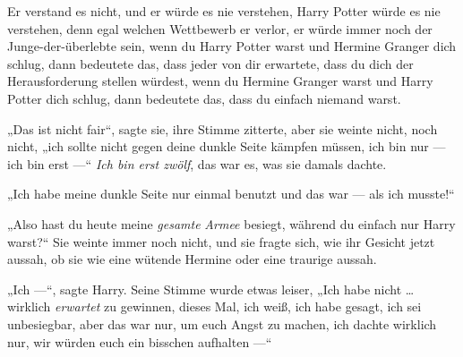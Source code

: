 Er verstand es nicht, und er würde es nie verstehen, Harry Potter würde es nie verstehen, denn egal welchen Wettbewerb er verlor, er würde immer noch der Junge-der-überlebte sein, wenn du Harry Potter warst und Hermine Granger dich schlug, dann bedeutete das, dass jeder von dir erwartete, dass du dich der Herausforderung stellen würdest, wenn du Hermine Granger warst und Harry Potter dich schlug, dann bedeutete das, dass du einfach niemand warst.

„Das ist nicht fair“, sagte sie, ihre Stimme zitterte, aber sie weinte nicht, noch nicht, „ich sollte nicht gegen deine dunkle Seite kämpfen müssen, ich bin nur — ich bin erst —“ \emph{Ich bin erst zwölf}, das war es, was sie damals dachte.%

„Ich habe meine dunkle Seite nur einmal benutzt und das war — als ich musste!“

„Also hast du heute meine \emph{gesamte} \emph{Armee} besiegt, während du einfach nur Harry warst?“ Sie weinte immer noch nicht, und sie fragte sich, wie ihr Gesicht jetzt aussah, ob sie wie eine wütende Hermine oder eine traurige aussah.

„Ich —“, sagte Harry. Seine Stimme wurde etwas leiser,
„Ich habe nicht … wirklich \emph{erwartet} zu gewinnen, dieses Mal, ich weiß, ich habe gesagt, ich sei unbesiegbar, aber das war nur, um euch Angst zu machen, ich dachte wirklich nur, wir würden euch ein bisschen aufhalten —“

